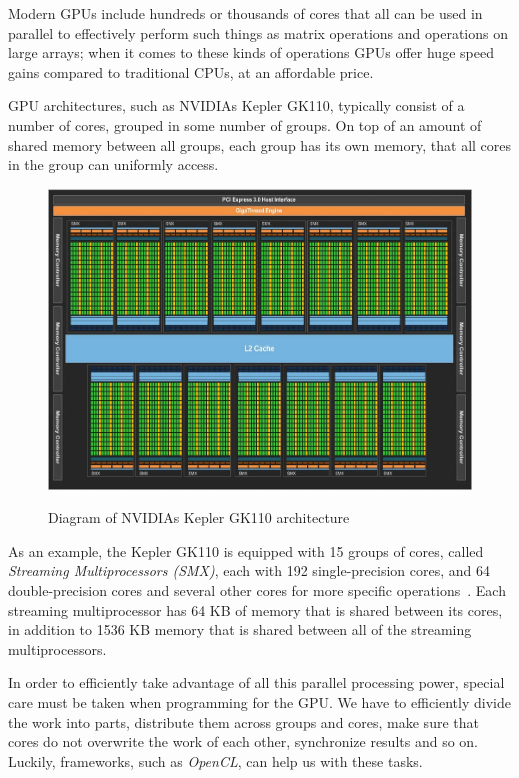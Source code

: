 Modern GPUs include hundreds or thousands of cores that all can be
used in parallel to effectively perform such things as matrix
operations and operations on large arrays; when it comes to these
kinds of operations GPUs offer huge speed gains compared to
traditional CPUs, at an affordable price.

GPU architectures, such as NVIDIAs Kepler GK110, typically consist of
a number of cores, grouped in some number of groups. On top of an
amount of shared memory between all groups, each group has its own
memory, that all cores in the group can uniformly access.

\begin{figure}
  \centering
  \caption{Diagram of NVIDIAs Kepler GK110 architecture}
  \includegraphics[width=1\textwidth]{figures/kepler110.png}
  \label{kepler}
\end{figure}

As an example, the Kepler GK110 is equipped with 15 groups of cores,
called \emph{Streaming Multiprocessors (SMX)}, each with 192
single-precision cores, and 64 double-precision cores and several
other cores for more specific operations~\cite{kepler}. Each streaming
multiprocessor has 64 KB of memory that is shared between its cores,
in addition to 1536 KB memory that is shared between all of the
streaming multiprocessors.

In order to efficiently take advantage of all this parallel processing
power, special care must be taken when programming for the GPU. We
have to efficiently divide the work into parts, distribute them across
groups and cores, make sure that cores do not overwrite the work of
each other, synchronize results and so on. Luckily, frameworks, such
as \emph{OpenCL}, can help us with these tasks.


